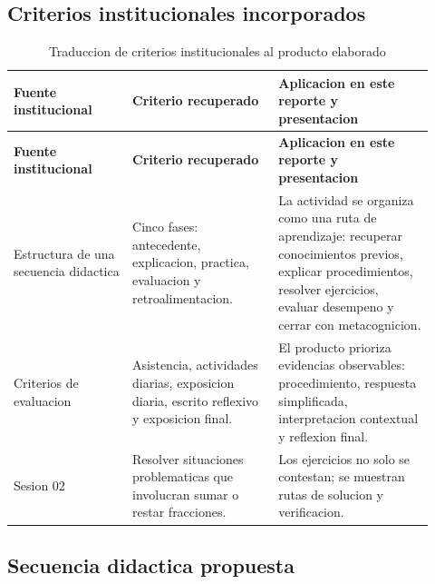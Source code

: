 \documentclass[
	spanish,
	letterpaper, oneside
]{article}
\begin{document}
\subsection{Criterios institucionales incorporados}

\begin{longtable}{@{}p{0.26\linewidth}p{0.32\linewidth}p{0.34\linewidth}@{}}
	\caption{Traduccion de criterios institucionales al producto elaborado}\label{tab:criterios-institucionales}\\
	\toprule
	\textbf{Fuente institucional} & \textbf{Criterio recuperado} & \textbf{Aplicacion en este reporte y presentacion} \\
	\midrule
	\endfirsthead
	\toprule
	\textbf{Fuente institucional} & \textbf{Criterio recuperado} & \textbf{Aplicacion en este reporte y presentacion} \\
	\midrule
	\endhead
	Estructura de una secuencia didactica & Cinco fases: antecedente, explicacion, practica, evaluacion y retroalimentacion. & La actividad se organiza como una ruta de aprendizaje: recuperar conocimientos previos, explicar procedimientos, resolver ejercicios, evaluar desempeno y cerrar con metacognicion. \\
	Criterios de evaluacion & Asistencia, actividades diarias, exposicion diaria, escrito reflexivo y exposicion final. & El producto prioriza evidencias observables: procedimiento, respuesta simplificada, interpretacion contextual y reflexion final. \\
	Sesion 02 & Resolver situaciones problematicas que involucran sumar o restar fracciones. & Los ejercicios no solo se contestan; se muestran rutas de solucion y verificacion. \\
	\bottomrule
\end{longtable}

\subsection{Secuencia didactica propuesta}
\end{document}
